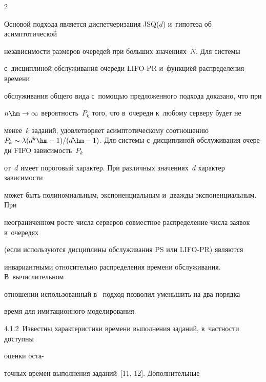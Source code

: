 \begin{multicols}{2}
    


    Основой подхода является диспетчеризация JSQ($d$) и~гипотеза об асимптотической 


независи\-мости размеров очередей при больших значениях~$N$. Для системы 


с~дисциплиной обслуживания очереди LIFO-PR и~функцией распределения времени 


обслуживания общего вида с~помощью предложенного подхода доказано, что при 


$n\hm\to\infty$ вероятность~$P_k$ того, что в~очереди к~любому серверу будет не 


менее~$k$ заданий, удовлетворяет асимптотическому соотношению $P_k\sim \lambda (d^k\hm-


1)/(d\hm-1)$. Для системы с~дисциплиной обслуживания очере-\linebreak ди \mbox{FIFO} зависимость~$P_k$ 


от~$d$ имеет пороговый харак\-тер. При различных значениях~$d$ характер зависимости 


может быть полиномиальным, экспоненциальным и~дважды экспоненциальным. При 


неограниченном рос\-те числа серверов совместное распределение числа заявок в~очередях 


(если используются дисциплины обслуживания PS или LIFO-PR) являются 


инвариантными относительно распределения времени обслуживания. В~вычислительном 


отношении использованный в~\cite{10-kon} подход позволил уменьшить на два порядка 


время для имитационного моделирования.


    


    \smallskip


    


    4.1.2\ Известны характеристики времени выполнения заданий, в~частности доступны 


оценки оста-\linebreak\vspace*{-12pt}





\columnbreak





\noindent


точных времен выполнения заданий~[11, 12]. Дополнительные 



\end{multicols}
